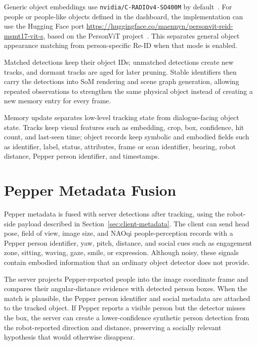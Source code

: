 Generic object embeddings use \texttt{nvidia/C-RADIOv4-SO400M} by default~\cite{nvidia_cradiov4_so400m_2026, ranzinger_c-radiov4_2026}.
For people or people-like objects defined in the dashboard, the implementation can use the Hugging Face port \url{https://huggingface.co/maennyn/personvit-reid-msmt17-vit-s}, based on the PersonViT project~\cite{hustvl_personvit_2026, hu2024personvitlargescaleselfsupervisedvision}.
This separates general object appearance matching from person-specific Re-ID when that mode is enabled.

Matched detections keep their object IDs; unmatched detections create new tracks, and dormant tracks are aged for later pruning.
Stable identifiers then carry the detections into SoM rendering and scene graph generation, allowing repeated observations to strengthen the same physical object instead of creating a new memory entry for every frame.

Memory update separates low-level tracking state from dialogue-facing object state.
Tracks keep visual features such as embedding, crop, box, confidence, hit count, and last-seen time; object records keep symbolic and embodied fields such as identifier, label, status, attributes, frame or scan identifier, bearing, robot distance, Pepper person identifier, and timestamps.

\section{Pepper Metadata Fusion}\label{sec:server-pepper-fusion}

Pepper metadata is fused with server detections after tracking, using the robot-side payload described in Section~\ref{sec:client-metadata}.
The client can send head pose, field of view, image size, and NAOqi people-perception records with a Pepper person identifier, yaw, pitch, distance, and social cues such as engagement zone, sitting, waving, gaze, smile, or expression.
Although noisy, these signals contain embodied information that an ordinary object detector does not provide.

The server projects Pepper-reported people into the image coordinate frame and compares their angular-distance evidence with detected person boxes.
When the match is plausible, the Pepper person identifier and social metadata are attached to the tracked object.
If Pepper reports a visible person but the detector misses the box, the server can create a lower-confidence synthetic person detection from the robot-reported direction and distance, preserving a socially relevant hypothesis that would otherwise disappear.

